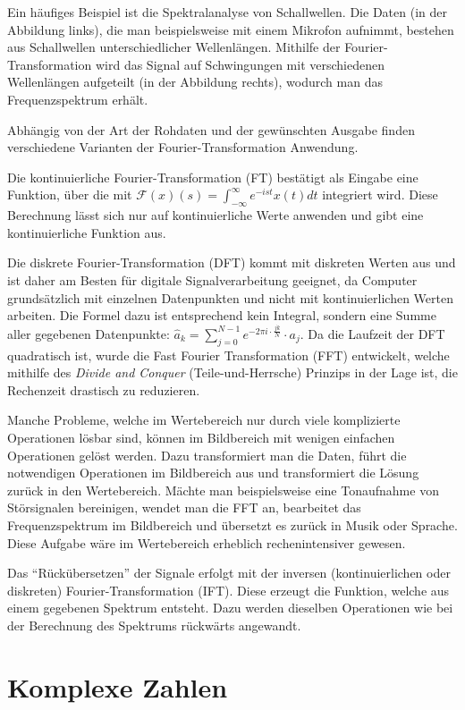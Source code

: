 \documentclass[]{dsadokumentation}
\begin{document}
Ein häufiges Beispiel ist die Spektralanalyse von Schallwellen. Die Daten (in der Abbildung links), die man beispielsweise mit einem Mikrofon aufnimmt, bestehen aus Schallwellen unterschiedlicher Wellenlängen. Mithilfe der Fourier-Transformation wird das Signal auf Schwingungen mit verschiedenen Wellenl\"angen aufgeteilt (in der Abbildung rechts), wodurch man das Frequenzspektrum erhält.

Abhängig von der Art der Rohdaten und der gewünschten Ausgabe finden verschiedene Varianten der Fourier-Transformation Anwendung.

Die kontinuierliche Fourier-Transformation (FT) bestätigt als Eingabe eine Funktion, über die mit $\mathcal{F}(x)(s)=\int_{-\infty}^{\infty}e^{-ist}x(t)dt$ integriert wird. Diese Berechnung lässt sich nur auf kontinuierliche Werte anwenden und gibt eine kontinuierliche Funktion aus.

Die diskrete Fourier-Transformation (DFT) kommt mit diskreten Werten aus und ist daher am Besten für digitale Signalverarbeitung geeignet, da Computer grundsätzlich mit einzelnen Datenpunkten und nicht mit kontinuierlichen Werten arbeiten. Die Formel dazu ist entsprechend kein Integral, sondern eine Summe aller gegebenen Datenpunkte: $\hat a_k = \sum\limits_{j=0}^{N-1}e^{-2\pi i\cdot\frac{jk}{N}}\cdot a_j$. Da die Laufzeit der DFT quadratisch ist, wurde die Fast Fourier Transformation (FFT) entwickelt, welche mithilfe des \emph{Divide and Conquer} (Teile-und-Herrsche) Prinzips in der Lage ist, die Rechenzeit drastisch zu reduzieren.

Manche Probleme, welche im Wertebereich nur durch viele komplizierte Operationen l\"osbar sind, k\"onnen im Bildbereich mit wenigen einfachen Operationen gel\"ost werden. Dazu transformiert man die Daten, führt die notwendigen Operationen im Bildbereich aus und transformiert die Lösung zurück in den Wertebereich. Mächte man beispielsweise eine Tonaufnahme von Störsignalen bereinigen, wendet man die FFT an, bearbeitet das Frequenzspektrum im Bildbereich und übersetzt es zurück in Musik oder Sprache. Diese Aufgabe w\"are im Wertebereich erheblich rechenintensiver gewesen.

Das \enquote{Rückübersetzen} der Signale erfolgt mit der inversen (kontinuierlichen oder diskreten) Fourier-Transformation (IFT). Diese erzeugt die Funktion, welche aus einem gegebenen Spektrum entsteht. Dazu werden dieselben Operationen wie bei der Berechnung des Spektrums rückwärts angewandt.

\section{Komplexe Zahlen}
\end{document}
